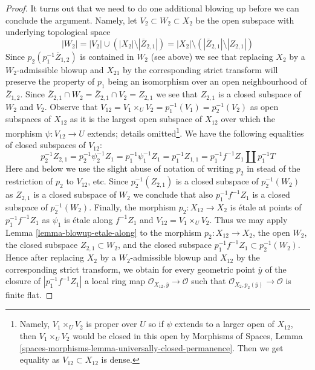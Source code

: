 \begin{proof}
\medskip\noindent
It turns out that we need to do one additional blowing up before we
can conclude the argument. Namely, let $V_2 \subset W_2 \subset X_2$
be the open subspace with underlying topological space
$$
|W_2| =
|V_2| \cup (|X_2| \setminus |\overline{Z}_{2, 1}|) =
|X_2| \setminus \left(|\overline{Z}_{2, 1}| \setminus |Z_{2, 1}|\right)
$$
Since $p_2(p_1^{-1}\overline{Z}_{1, 2})$ is contained in $W_2$ (see above)
we see that replacing $X_2$ by a $W_2$-admissible blowup and $X_{21}$
by the corresponding strict transform will preserve the property of
$p_1$ being an isomorphism over an open neighbourhood of $\overline{Z}_{1, 2}$.
Since $\overline{Z}_{2, 1} \cap W_2 = \overline{Z}_{2, 1} \cap V_2 = Z_{2, 1}$
we see that $Z_{2, 1}$ is a closed subspace of $W_2$ and $V_2$.
Observe that $V_{12} = V_1 \times_U V_2 = p_1^{-1}(V_1) = p_2^{-1}(V_2)$
as open subspaces of $X_{12}$ as it is the largest open subspace of $X_{12}$
over which the morphism $\psi : V_{12} \to U$ extends; details
omitted\footnote{Namely, $V_1 \times_U V_2$ is proper over $U$ so if
$\psi$ extends to a larger open of $X_{12}$, then $V_1 \times_U V_2$
would be closed in this open by Morphisms of Spaces, Lemma
\ref{spaces-morphisms-lemma-universally-closed-permanence}.
Then we get equality as $V_{12} \subset X_{12}$ is dense.}.
We have the following equalities of closed subspaces of $V_{12}$:
$$
p_2^{-1}Z_{2, 1} = p_2^{-1} \psi_2^{-1} Z_1 =
p_1^{-1} \psi_1^{-1} Z_1= p_1^{-1}Z_{1, 1} =
p_1^{-1}f^{-1}Z_1 \amalg p_1^{-1}T
$$
Here and below we use the slight abuse of notation of writing $p_2$ in
stead of the restriction of $p_2$ to $V_{12}$, etc.
Since $p_2^{-1}(Z_{2, 1})$ is a closed subspace of $p_2^{-1}(W_2)$
as $Z_{2, 1}$ is a closed subspace of $W_2$ we conclude that also
$p_1^{-1}f^{-1}Z_1$ is a closed subspace of $p_2^{-1}(W_2)$.
Finally, the morphism $p_2 : X_{12} \to X_2$ is \'etale at points of
$p_1^{-1}f^{-1}Z_1$ as $\psi_1$ is \'etale along $f^{-1}Z_1$
and $V_{12} = V_1 \times_U V_2$.
Thus we may apply Lemma \ref{lemma-blowup-etale-along} to the morphism
$p_2 : X_{12} \to X_2$, the open $W_2$, the closed subspace
$Z_{2, 1} \subset W_2$, and the closed subspace
$p_1^{-1}f^{-1}Z_1 \subset p_2^{-1}(W_2)$.
Hence after replacing $X_2$ by a $W_2$-admissible blowup and $X_{12}$ by
the corresponding strict transform, we obtain for every geometric
point $\overline{y}$ of the closure of $|p_1^{-1}f^{-1}Z_1|$ a local ring map
$\mathcal{O}_{X_{12}, \overline{y}} \to \mathcal{O}$ such that
$\mathcal{O}_{X_2, p_2(\overline{y})} \to \mathcal{O}$ is finite flat.


\end{proof}
